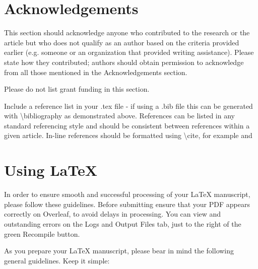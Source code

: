 \documentclass[10pt,a4paper]{article}
\begin{document}
\section*{Acknowledgements}
This section should acknowledge anyone who contributed to the research or the article but who does not qualify as an author based on the criteria provided earlier (e.g. someone or an organization that provided writing assistance). Please state how they contributed; authors should obtain permission to acknowledge from all those mentioned in the Acknowledgements section.

Please do not list grant funding in this section.

{\small
}

Include a reference list in your .tex file - if using a .bib file this can be generated with \textbackslash bibliography as demonstrated above. References can be listed in any standard referencing style and should be consistent between references within a given article. In-line references should be formatted using \textbackslash cite, for example \cite{Smith:2012qr} and \cite{Smith:2013jd} 


\section*{Using LaTeX}
In order to ensure smooth and successful processing of your LaTeX manuscript, please follow these guidelines. Before submitting ensure that your PDF appears correctly on Overleaf, to avoid delays in processing. You can view and outstanding errors on the Logs and Output Files tab, just to the right of the green Recompile button.

As you prepare your LaTeX manuscript, please bear in mind the following general guidelines.  
Keep it simple:
\end{document}
